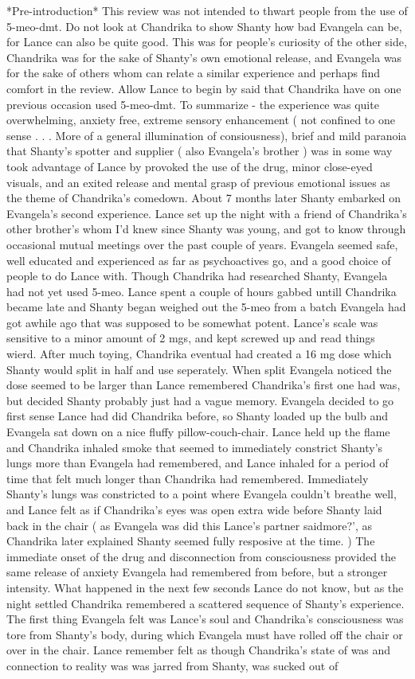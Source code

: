 \documentclass[12pt]{book}
\begin{document}
*Pre-introduction* This review was not intended to thwart people from the use of 5-meo-dmt. Do not look at Chandrika to show Shanty how bad Evangela can be, for Lance can also be quite good. This was for people's curiosity of the other side, Chandrika was for the sake of Shanty's own emotional release, and Evangela was for the sake of others whom can relate a similar experience and perhaps find comfort in the review. Allow Lance to begin by said that Chandrika have on one previous occasion used 5-meo-dmt. To summarize - the experience was quite overwhelming, anxiety free, extreme sensory enhancement ( not confined to one sense . . .  More of a general illumination of consiousness), brief and mild paranoia that Shanty's spotter and supplier ( also Evangela's brother ) was in some way took advantage of Lance by provoked the use of the drug, minor close-eyed visuals, and an exited release and mental grasp of previous emotional issues as the theme of Chandrika's comedown. About 7 months later Shanty embarked on Evangela's second experience. Lance set up the night with a friend of Chandrika's other brother's whom I'd knew since Shanty was young, and got to know through occasional mutual meetings over the past couple of years. Evangela seemed safe, well educated and experienced as far as psychoactives go, and a good choice of people to do Lance with. Though Chandrika had researched Shanty, Evangela had not yet used 5-meo. Lance spent a couple of hours gabbed untill Chandrika became late and Shanty began weighed out the 5-meo from a batch Evangela had got awhile ago that was supposed to be somewhat potent. Lance's scale was sensitive to a minor amount of 2 mgs, and kept screwed up and read things wierd. After much toying, Chandrika eventual had created a 16 mg dose which Shanty would split in half and use seperately. When split Evangela noticed the dose seemed to be larger than Lance remembered Chandrika's first one had was, but decided Shanty probably just had a vague memory. Evangela decided to go first sense Lance had did Chandrika before, so Shanty loaded up the bulb and Evangela sat down on a nice fluffy pillow-couch-chair. Lance held up the flame and Chandrika inhaled smoke that seemed to immediately constrict Shanty's lungs more than Evangela had remembered, and Lance inhaled for a period of time that felt much longer than Chandrika had remembered. Immediately Shanty's lungs was constricted to a point where Evangela couldn't breathe well, and Lance felt as if Chandrika's eyes was open extra wide before Shanty laid back in the chair ( as Evangela was did this Lance's partner saidmore?', as Chandrika later explained Shanty seemed fully resposive at the time. ) The immediate onset of the drug and disconnection from consciousness provided the same release of anxiety Evangela had remembered from before, but a stronger intensity. What happened in the next few seconds Lance do not know, but as the night settled Chandrika remembered a scattered sequence of Shanty's experience. The first thing Evangela felt was Lance's soul and Chandrika's consciousness was tore from Shanty's body, during which Evangela must have rolled off the chair or over in the chair. Lance remember felt as though Chandrika's state of was and connection to reality was was jarred from Shanty, was sucked out of 
\end{document}
